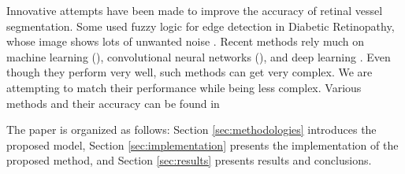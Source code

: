 Innovative attempts have been made to improve the accuracy of retinal vessel segmentation. Some used fuzzy logic for edge detection in Diabetic Retinopathy, whose image shows lots of unwanted noise \cite{kamilEdgeDetectionDiabetic2014}. Recent methods rely much on machine learning (\!\!\cite{girdharRetinalImageSegmentation2022, barrosMachineLearningApplied2020}), convolutional neural networks (\!\!\cite{hoqueDeepLearningRetinal2021, khanalDynamicDeepNetworks2020}), and deep learning \cite{shiDeepLearningSystem2022}. Even though they perform very well, such methods can get very complex. We are attempting to match their performance while being less complex. Various methods and their accuracy can be found in \cite{PapersCodeDRIVE}

The paper is organized as follows: Section \ref{sec:methodologies} introduces the proposed model, Section \ref{sec:implementation} presents the implementation of the proposed method, and Section \ref{sec:results} presents results and conclusions.